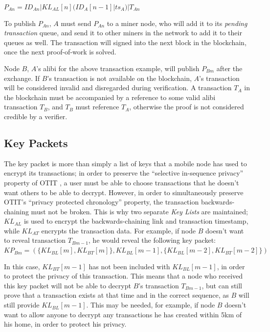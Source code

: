 $P_{An} = ID_{An}|KL_{AL}[n](ID_{A}[n-1]|ts_A)|T_{An}$

\null
To publish $P_{An}$, $A$ must send $P_{An}$ to a miner node, who will add it to its \textit{pending transaction} queue, and send it to other miners in the network to add it to their queues as well. The transaction will signed into the next block in the blockchain, once the next proof-of-work is solved.

Node $B$, $A$'s alibi for the above transaction example, will publish $P_{Bm}$ after the exchange. If $B$'s transaction is not available on the blockchain, $A$'s transaction will be considered invalid and disregarded during verification. A transaction $T_A$ in the blockchain must be accompanied by a reference to some valid alibi transaction $T_B$, and $T_B$ must reference $T_A$, otherwise the proof is not considered credible by a verifier.

\subsection{Key Packets} \label{sssec:key_packets}
The key packet is more than simply a list of keys that a mobile node has used to encrypt its transactions; in order to preserve the ``selective in-sequence privacy'' property of OTIT \cite{otit}, a user must be able to choose transactions that he doesn't want others to be able to decrypt. However, in order to simultaneously preserve OTIT's ``privacy protected chronology'' property, the transaction backwards-chaining must not be broken. This is why two separate \textit{Key Lists} are maintained; $KL_{AL}$ is used to encrypt the backwards-chaining link and transaction timestamp, while $KL_{AT}$ encrypts the transaction data. For example, if node $B$ doesn't want to reveal transaction $T_{Bm-1}$, he would reveal the following key packet:
\\

${KP_{Bm} = (\{KL_{BL}[m], KL_{BT}[m]\}, KL_{BL}[m-1], \{KL_{BL}[m-2], KL_{BT}[m-2]\})}$

\null
In this case, $KL_{BT}[m-1]$ has not been included with $KL_{BL}[m-1]$, in order to protect the privacy of this transaction. This means that a node who received this key packet will not be able to decrypt $B$'s transaction $T_{Bm-1}$, but can still prove that a transaction exists at that time and in the correct sequence, as $B$ will still provide $KL_{BL}[m-1]$. This may be needed, for example, if node $B$ doesn't want to allow anyone to decrypt any transactions he has created within 5km of his home, in order to protect his privacy.

